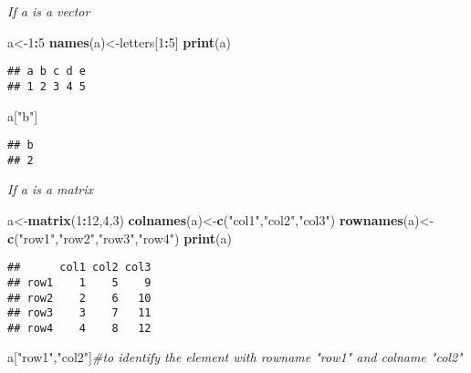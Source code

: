 \documentclass[]{book}
\newenvironment{Shaded}{\begin{snugshade}}{\end{snugshade}}
\newcommand{\KeywordTok}[1]{\textcolor[rgb]{0.13,0.29,0.53}{\textbf{#1}}}
\newcommand{\DecValTok}[1]{\textcolor[rgb]{0.00,0.00,0.81}{#1}}
\newcommand{\StringTok}[1]{\textcolor[rgb]{0.31,0.60,0.02}{#1}}
\newcommand{\CommentTok}[1]{\textcolor[rgb]{0.56,0.35,0.01}{\textit{#1}}}
\newcommand{\OperatorTok}[1]{\textcolor[rgb]{0.81,0.36,0.00}{\textbf{#1}}}
\newcommand{\NormalTok}[1]{#1}
\theoremstyle{definition}
\theoremstyle{definition}
\theoremstyle{definition}
\theoremstyle{remark}
\begin{document}
\emph{If a is a vector}

\begin{Shaded}
\begin{Highlighting}[]
\NormalTok{a<-}\DecValTok{1}\OperatorTok{:}\DecValTok{5}
\KeywordTok{names}\NormalTok{(a)<-letters[}\DecValTok{1}\OperatorTok{:}\DecValTok{5}\NormalTok{]}
\KeywordTok{print}\NormalTok{(a)}
\end{Highlighting}
\end{Shaded}

\begin{verbatim}
## a b c d e 
## 1 2 3 4 5
\end{verbatim}

\begin{Shaded}
\begin{Highlighting}[]
\NormalTok{a[}\StringTok{"b"}\NormalTok{]}
\end{Highlighting}
\end{Shaded}

\begin{verbatim}
## b 
## 2
\end{verbatim}

\emph{If a is a matrix}

\begin{Shaded}
\begin{Highlighting}[]
\NormalTok{a<-}\KeywordTok{matrix}\NormalTok{(}\DecValTok{1}\OperatorTok{:}\DecValTok{12}\NormalTok{,}\DecValTok{4}\NormalTok{,}\DecValTok{3}\NormalTok{)}
\KeywordTok{colnames}\NormalTok{(a)<-}\KeywordTok{c}\NormalTok{(}\StringTok{"col1"}\NormalTok{,}\StringTok{"col2"}\NormalTok{,}\StringTok{"col3"}\NormalTok{)}
\KeywordTok{rownames}\NormalTok{(a)<-}\KeywordTok{c}\NormalTok{(}\StringTok{"row1"}\NormalTok{,}\StringTok{"row2"}\NormalTok{,}\StringTok{"row3"}\NormalTok{,}\StringTok{"row4"}\NormalTok{)}
\KeywordTok{print}\NormalTok{(a)}
\end{Highlighting}
\end{Shaded}

\begin{verbatim}
##      col1 col2 col3
## row1    1    5    9
## row2    2    6   10
## row3    3    7   11
## row4    4    8   12
\end{verbatim}

\begin{Shaded}
\begin{Highlighting}[]
\NormalTok{a[}\StringTok{"row1"}\NormalTok{,}\StringTok{"col2"}\NormalTok{]}\CommentTok{#to identify the element with rowname "row1" and colname "col2"}
\end{Highlighting}
\end{Shaded}
\end{document}
